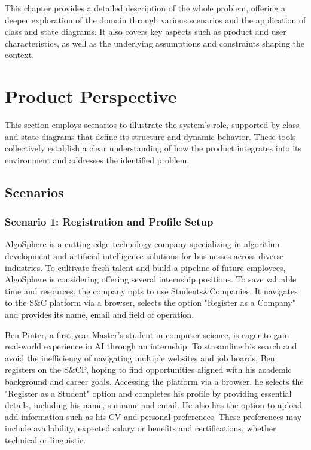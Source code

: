This chapter provides a detailed description of the whole problem, offering a deeper exploration of the domain through various scenarios and the application of class and state diagrams.
It also covers key aspects such as product and user characteristics, as well as the underlying assumptions and constraints shaping the context.

\section{Product Perspective}
This section employs scenarios to illustrate the system's role, supported by class and state diagrams that define its structure and dynamic behavior.
These tools collectively establish a clear understanding of how the product integrates into its environment and addresses the identified problem.

\subsection{Scenarios}
\subsubsection{Scenario 1: Registration and Profile Setup}
AlgoSphere is a cutting-edge technology company specializing in algorithm development and artificial intelligence solutions for businesses across diverse industries.
To cultivate fresh talent and build a pipeline of future employees, AlgoSphere is considering offering several internship positions.
To save valuable time and resources, the company opts to use Students\&Companies.
It navigates to the S\&C platform via a browser, selects the option "Register as a Company"
and provides its name, email and field of operation.

Ben Pinter, a first-year Master's student in computer science, is eager to gain real-world experience in AI through an internship.
To streamline his search and avoid the inefficiency of navigating multiple websites and job boards, Ben registers on the S\&CP, hoping to find opportunities aligned with his academic background and career goals.
Accessing the platform via a browser, he selects the "Register as a Student" option and completes his profile by providing essential details, including his name, surname and email.
He also has the option to upload add information such as his CV and personal preferences.
These preferences may include availability, expected salary or benefits and certifications, whether technical or linguistic.

